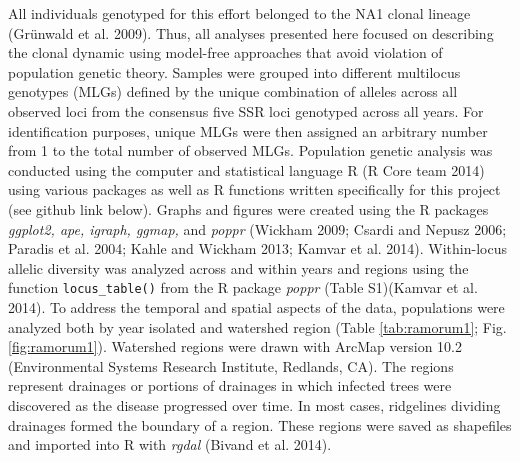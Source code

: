 \documentclass[double,12pt]{beavtex}
\begin{document}
  All individuals genotyped for this effort belonged to the NA1 clonal
  lineage (Grünwald et al. 2009). Thus, all analyses presented here
  focused on describing the clonal dynamic using model-free approaches
  that avoid violation of population genetic theory. Samples were grouped
  into different multilocus genotypes (MLGs) defined by the unique
  combination of alleles across all observed loci from the consensus five
  SSR loci genotyped across all years. For identification purposes, unique
  MLGs were then assigned an arbitrary number from 1 to the total number
  of observed MLGs. Population genetic analysis was conducted using the
  computer and statistical language R (R Core team 2014) using various
  packages as well as R functions written specifically for this project
  (see github link below). Graphs and figures were created using the R
  packages \emph{ggplot2, ape, igraph, ggmap,} and \emph{poppr} (Wickham
  2009; Csardi and Nepusz 2006; Paradis et al. 2004; Kahle and Wickham
  2013; Kamvar et al. 2014). Within-locus allelic diversity was analyzed
  across and within years and regions using the function
  \texttt{locus\_table()} from the R package \emph{poppr} (Table
  S1)(Kamvar et al. 2014). To address the temporal and spatial aspects of
  the data, populations were analyzed both by year isolated and watershed
  region (Table \ref{tab:ramorum1}; Fig. \ref{fig:ramorum1}). Watershed
  regions were drawn with ArcMap version 10.2 (Environmental Systems
  Research Institute, Redlands, CA). The regions represent drainages or
  portions of drainages in which infected trees were discovered as the
  disease progressed over time. In most cases, ridgelines dividing
  drainages formed the boundary of a region. These regions were saved as
  shapefiles and imported into R with \emph{rgdal} (Bivand et al. 2014).
  
\end{document}
